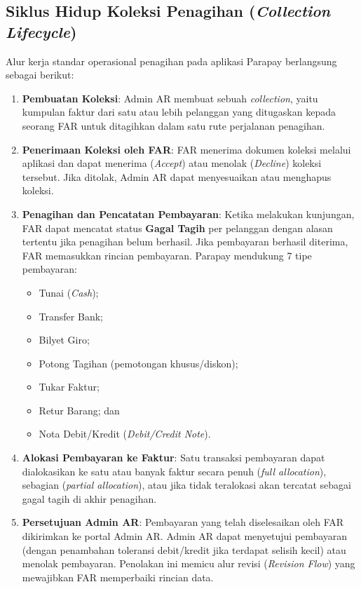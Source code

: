\subsection{Siklus Hidup Koleksi Penagihan (\textit{Collection Lifecycle})}
Alur kerja standar operasional penagihan pada aplikasi Parapay berlangsung sebagai berikut:
\begin{enumerate}[label=\arabic*)]
  \item \textbf{Pembuatan Koleksi}: Admin AR membuat sebuah \textit{collection}, yaitu kumpulan faktur dari satu atau lebih pelanggan yang ditugaskan kepada seorang FAR untuk ditagihkan dalam satu rute perjalanan penagihan.
  \item \textbf{Penerimaan Koleksi oleh FAR}: FAR menerima dokumen koleksi melalui aplikasi dan dapat menerima (\textit{Accept}) atau menolak (\textit{Decline}) koleksi tersebut. Jika ditolak, Admin AR dapat menyesuaikan atau menghapus koleksi.
  \item \textbf{Penagihan dan Pencatatan Pembayaran}: Ketika melakukan kunjungan, FAR dapat mencatat status \textbf{Gagal Tagih} per pelanggan dengan alasan tertentu jika penagihan belum berhasil. Jika pembayaran berhasil diterima, FAR memasukkan rincian pembayaran. Parapay mendukung 7 tipe pembayaran:
  \begin{itemize}
    \item Tunai (\textit{Cash});
    \item Transfer Bank;
    \item Bilyet Giro;
    \item Potong Tagihan (pemotongan khusus/diskon);
    \item Tukar Faktur;
    \item Retur Barang; dan
    \item Nota Debit/Kredit (\textit{Debit/Credit Note}).
  \end{itemize}
  \item \textbf{Alokasi Pembayaran ke Faktur}: Satu transaksi pembayaran dapat dialokasikan ke satu atau banyak faktur secara penuh (\textit{full allocation}), sebagian (\textit{partial allocation}), atau jika tidak teralokasi akan tercatat sebagai gagal tagih di akhir penagihan.
  \item \textbf{Persetujuan Admin AR}: Pembayaran yang telah diselesaikan oleh FAR dikirimkan ke portal Admin AR. Admin AR dapat menyetujui pembayaran (dengan penambahan toleransi debit/kredit jika terdapat selisih kecil) atau menolak pembayaran. Penolakan ini memicu alur revisi (\textit{Revision Flow}) yang mewajibkan FAR memperbaiki rincian data.
\end{enumerate}

